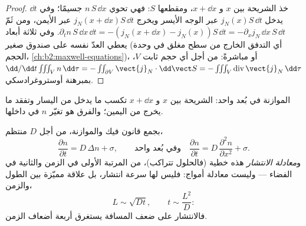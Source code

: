 \begin{proof}
خذ الشريحة بين $x$ و $x + \dd x$، ومقطعها $S$: فهي تحوي
$n\,S\,\dd x$ جسيمًا؛ وفي $\dd t$ يدخل $j_N(x)S\,\dd t$ عبر
الوجه الأيسر ويخرج $j_N(x + \dd x)S\,\dd t$ عبر الأيمن، ومن ثَمّ
$\partial_t n\,S\,\dd x\,\dd t = -(j_N(x+\dd x) - j_N(x))S\,\dd t =
-\partial_x j_N\,\dd x\,S\,\dd t$. وفي ثلاثة أبعاد يعطي العدّ نفسه على
صندوق صغير  (أي التدفق الخارج من سطح مغلق في
وحدة الحجم، \cref{ch:b2:maxwell-equations})، أو مباشرةً: من أجل أي حجم
ثابت $V$، $\dd/\dd t \iiint_V n\,\dd\tau = -\iint_{\partial V}
\vect{j}_N\cdot\dd\vect S = -\iiint_V \operatorname{div}\vect{j}_N\,\dd\tau$
بمبرهنة أوستروغرادسكي.
\end{proof}

\begin{omfigure}

{\small الموازنة في بُعد واحد: الشريحة بين $x$ و $x + \dd
x$ تكسب ما يدخل من اليسار وتفقد ما يخرج من اليمين؛
والفرق هو تغيّر $n$ في داخلها.}
\end{omfigure}

\begin{theorem}\label{thm:b2:particle-diffusion:equation}
بجمع قانون فيك والموازنة، من أجل $D$ منتظم،
\[
\frac{\partial n}{\partial t} = D\,\Delta n + \sigma ,
\qquad\text{وفي بُعد واحد}\quad
\frac{\partial n}{\partial t} = D\,\frac{\partial^2 n}{\partial x^2} + \sigma .
\]
و\emph{معادلة الانتشار} هذه خطية
(فالحلول تتراكب)، من المرتبة الأولى في الزمن والثانية في الفضاء
--- وليست معادلة أمواج: فليس لها سرعة انتشار، بل
علاقة مميّزة بين الطول والزمن،
\[
L \sim \sqrt{D t}, \qquad t \sim \frac{L^2}{D} :
\]
فالانتشار على ضعف المسافة يستغرق أربعة أضعاف الزمن.
\end{theorem}

